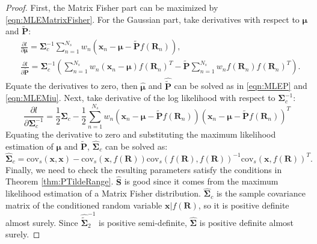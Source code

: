 \documentclass[12pt]{article}
\begin{document}
\begin{proof}
	First, the Matrix Fisher part can be maximized by \eqref{eqn:MLEMatrixFisher}.
	For the Gaussian part, take derivatives with respect to $\bm{\mu}$ and $\tilde{\mathbf{P}}$:
	\begin{align}
		&\frac{\partial l}{\partial \bm{\mu}} = \mathbf{\Sigma}_c^{-1}\sum_{n=1}^{N_s}w_n\left(\bm{x}_n-\bm{\mu}-\tilde{\mathbf{P}}f(\mathbf{R}_n)\right), \\
		&\frac{\partial l}{\partial \tilde{\mathbf{P}}} = \mathbf{\Sigma}_c^{-1} \left(\sum_{n=1}^{N_s}w_n(\bm{x}_n-\bm{\mu})f(\mathbf{R}_n)^T - \tilde{\mathbf{P}}\sum_{n=1}^{N_s}w_nf(\mathbf{R}_n)f(\mathbf{R}_n)^T\right).
		\label{eqn:logDeriP0}
	\end{align}
	Equate the derivatives to zero, then $\hat{\bm{\mu}}$ and $\hat{\tilde{\mathbf{P}}}$ can be solved as in \eqref{eqn:MLEP} and \eqref{eqn:MLEMiu}.
	Next, take derivative of the log likelihood with respect to $\mathbf{\Sigma}_c^{-1}$:
	\begin{equation}
		\frac{\partial l}{\partial \mathbf{\Sigma}_c^{-1}} = \frac{1}{2}\mathbf{\Sigma}_c - \frac{1}{2}\sum_{n=1}^{N_s}w_n\left(\bm{x}_n-\bm{\mu}-\tilde{\mathbf{P}}f(\mathbf{R}_n)\right)\left(\bm{x}_n-\bm{\mu}-\tilde{\mathbf{P}}f(\mathbf{R}_n)\right)^T
	\end{equation}
	Equating the derivative to zero and substituting the maximum likelihood estimation of $\bm{\mu}$ and $\tilde{\mathbf{P}}$, $\hat{\mathbf{\Sigma}}_c$ can be solved as:
	\begin{equation}
		\hat{\mathbf{\Sigma}}_c = \mathrm{cov}_s(\bm{x},\bm{x}) - \mathrm{cov}_s(\bm{x},f(\mathbf{R}))\mathrm{cov}_s(f(\mathbf{R}),f(\mathbf{R}))^{-1}\mathrm{cov}_s(\bm{x},f(\mathbf{R}))^T.
	\end{equation}
	Finally, we need to check the resulting parameters satisfy the conditions in Theorem \ref{thm:PTildeRange}.
	$\hat{\mathbf{S}}$ is good since it comes from the maximum likelihood estimation of a Matrix Fisher distribution.
	$\hat{\mathbf{\Sigma}}_c$ is the sample covariance matrix of the conditioned random variable $\bm{x}|f(\mathbf{R})$, so it is positive definite almost surely.
	Since $\hat{\tilde{\mathbf{\Sigma}}}_2^{-1}$ is positive semi-definite, $\hat{\mathbf{\Sigma}}$ is positive definite almost surely.
\end{proof}

\appendix
\end{document}
